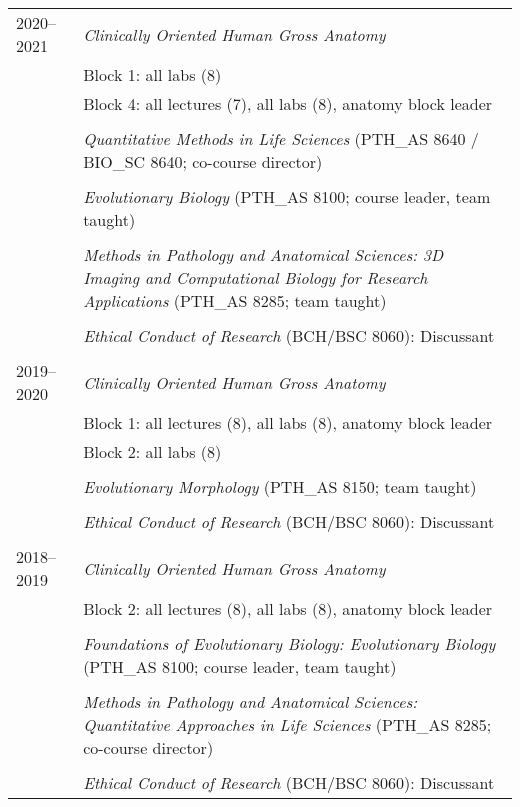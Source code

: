 \begin{longtable}{@{}lX@{}}
 2020--2021 & \textit{Clinically Oriented Human Gross Anatomy}\\
    & Block 1: all labs (8)\\
    & Block 4: all lectures (7), all labs (8), anatomy block leader\\
    \\
    & \textit{Quantitative Methods in Life Sciences} (PTH\_AS 8640 / BIO\_SC 8640; co-course director)\\
    \\
    & \textit{Evolutionary Biology} (PTH\_AS 8100; course leader, team taught)\\
    \\
    & \textit{Methods in Pathology and Anatomical Sciences: 3D Imaging and Computational Biology for Research Applications} (PTH\_AS 8285; team taught)\\
    \\
    & \textit{Ethical Conduct of Research} (BCH/BSC 8060): Discussant\\
    \\
  2019--2020 & \textit{Clinically Oriented Human Gross Anatomy}\\
    & Block 1: all lectures (8), all labs (8), anatomy block leader\\
    & Block 2: all labs (8)\\
    \\
    & \textit{Evolutionary Morphology} (PTH\_AS 8150; team taught)\\
    \\
    & \textit{Ethical Conduct of Research} (BCH/BSC 8060): Discussant\\
    \\
  2018--2019 & \textit{Clinically Oriented Human Gross Anatomy}\\
    & Block 2: all lectures (8), all labs (8), anatomy block leader\\
    \\
    & \textit{Foundations of Evolutionary Biology: Evolutionary Biology} (PTH\_AS 8100; course leader, team taught)\\
    \\
    & \textit{Methods in Pathology and Anatomical Sciences: Quantitative Approaches in Life Sciences} (PTH\_AS 8285; co-course director)\\
    \\
    & \textit{Ethical Conduct of Research} (BCH/BSC 8060): Discussant\\

\end{longtable}
